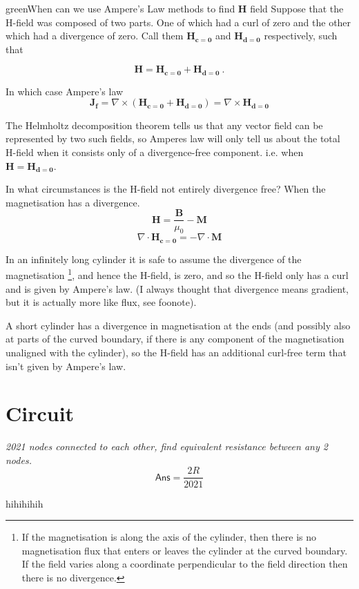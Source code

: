 \begin{mybox}{green}{When can we use Ampere's Law methods to find $\mathbf{H}$ field}
    Suppose that the H-field was composed of two parts. One of which had a curl of zero and the other which had a divergence of zero. Call them $\mathbf{H_{c=0}}$ and $\mathbf{H_{d=0}}$ respectively, such that

    $$\mathbf{H} = \mathbf{H_{c=0}} + \mathbf{H_{d=0}}\ .$$

    In which case Ampere's law
    $$\mathbf{J_f}=\nabla \times (\mathbf{H_{c=0}} + \mathbf{H_{d=0}})=\nabla \times \mathbf{H_{d=0}}$$

    The Helmholtz decomposition theorem tells us that any vector field can be represented by two such fields, so Amperes law will only tell us about the total H-field when it consists only of a divergence-free component. i.e. when $\mathbf{H}=\mathbf{H_{d=0}}$.

    In what circumstances is the H-field not entirely divergence free? When the magnetisation has a divergence.
    $$\mathbf{H}=\frac{\mathbf{B}}{\mu_0}-\mathbf{M}$$
    $$\nabla \cdot \mathbf{H_{c=0}} = - \nabla \cdot \mathbf{M}$$
\end{mybox}
In an infinitely long cylinder it is safe to assume the divergence of the magnetisation \footnote{ If the magnetisation is along the axis of the cylinder, then there is no magnetisation flux that enters or leaves the cylinder at the curved boundary. If the field varies along a coordinate perpendicular to the field direction then there is no divergence.}, and hence the H-field, is zero, and so the H-field only has a curl and is given by Ampere's law. (I always thought that divergence means gradient, but it is actually more like flux, see foonote).

A short cylinder has a divergence in magnetisation at the ends (and possibly also at parts of the curved boundary, if there is any component of the magnetisation unaligned with the cylinder), so the H-field has an additional curl-free term that isn't given by Ampere's law.

\section{Circuit}
\textit{2021 nodes connected to each other, find equivalent resistance between any 2 nodes.}
\begin{equation}
    \boxed{\textsf{Ans}=\frac{2R}{2021}}\nonumber
\end{equation}

hihihihih